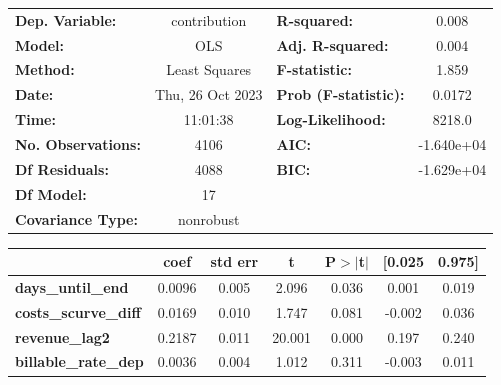 \begin{center}
\begin{tabular}{lclc}
\toprule
\textbf{Dep. Variable:}                     &   contribution   & \textbf{  R-squared:         } &     0.008   \\
\textbf{Model:}                             &       OLS        & \textbf{  Adj. R-squared:    } &     0.004   \\
\textbf{Method:}                            &  Least Squares   & \textbf{  F-statistic:       } &     1.859   \\
\textbf{Date:}                              & Thu, 26 Oct 2023 & \textbf{  Prob (F-statistic):} &   0.0172    \\
\textbf{Time:}                              &     11:01:38     & \textbf{  Log-Likelihood:    } &    8218.0   \\
\textbf{No. Observations:}                  &        4106      & \textbf{  AIC:               } & -1.640e+04  \\
\textbf{Df Residuals:}                      &        4088      & \textbf{  BIC:               } & -1.629e+04  \\
\textbf{Df Model:}                          &          17      & \textbf{                     } &             \\
\textbf{Covariance Type:}                   &    nonrobust     & \textbf{                     } &             \\
\bottomrule
\end{tabular}
\begin{tabular}{lcccccc}
                                            & \textbf{coef} & \textbf{std err} & \textbf{t} & \textbf{P$> |$t$|$} & \textbf{[0.025} & \textbf{0.975]}  \\
\midrule
\textbf{days\_until\_end}                   &       0.0096  &        0.005     &     2.096  &         0.036        &        0.001    &        0.019     \\
\textbf{costs\_scurve\_diff}                &       0.0169  &        0.010     &     1.747  &         0.081        &       -0.002    &        0.036     \\
\textbf{revenue\_lag2}                      &       0.2187  &        0.011     &    20.001  &         0.000        &        0.197    &        0.240     \\
\textbf{billable\_rate\_dep}                &       0.0036  &        0.004     &     1.012  &         0.311        &       -0.003    &        0.011     \\

\end{tabular}
\end{center}
